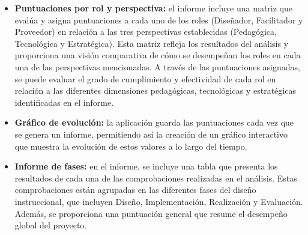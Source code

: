\begin{itemize}
	\item
	\textbf{Puntuaciones por rol y perspectiva:} el informe incluye una matriz que evalúa y asigna puntuaciones a cada uno de los roles (Diseñador, Facilitador y Proveedor) en relación a las tres perspectivas establecidas (Pedagógica, Tecnológica y Estratégica). Esta matriz refleja los resultados del análisis y proporciona una visión comparativa de cómo se desempeñan los roles en cada una de las perspectivas mencionadas. A través de las puntuaciones asignadas, se puede evaluar el grado de cumplimiento y efectividad de cada rol en relación a las diferentes dimensiones pedagógicas, tecnológicas y estratégicas identificadas en el informe.
	\item
	\textbf{Gráfico de evolución:} la aplicación guarda las puntuaciones cada vez que se genera un informe, permitiendo así la creación de un gráfico interactivo que muestra la evolución de estos valores a lo largo del tiempo. 
	\item
	\textbf{Informe de fases:} en el informe, se incluye una tabla que presenta los resultados de cada una de las comprobaciones realizadas en el análisis. Estas comprobaciones están agrupadas en las diferentes fases del diseño instruccional, que incluyen Diseño, Implementación, Realización y Evaluación. Además, se proporciona una puntuación general que resume el desempeño global del proyecto.


\end{itemize}
